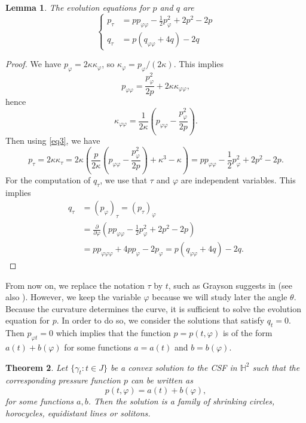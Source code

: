 \documentclass[12pt]{amsart}
\theoremstyle{plain}
\newtheorem{theorem}{Theorem}[section]
\newtheorem{lemma}[theorem]{Lemma}
\theoremstyle{definition}
\def\h{\mathbb H}
\begin{document}
\begin{lemma} 
 The evolution equations for $p$ and $q$ are 
\begin{equation}\label{evo}
\left\{
\begin{split}
p_\tau &= p p_{\varphi \varphi} - \frac{1}{2}p_{\varphi}^2 + 2p^2 - 2p \\
 q_\tau&= p(q_{\varphi \varphi} + 4q) - 2 q
\end{split}\right.
\end{equation}
\end{lemma}

\begin{proof}
We have $p_\varphi=2\kappa\kappa_\varphi$, so $\kappa_\varphi=p_\varphi/(2\kappa)$. This implies
$$p_{\varphi\varphi}=\frac{p_\varphi^2}{2p}+2\kappa\kappa_{\varphi\varphi},$$
hence
$$\kappa_{\varphi\varphi}=\frac{1}{2\kappa}\left(p_{\varphi\varphi}-\frac{p_\varphi^2}{2p}\right).$$
Then using \eqref{eq3}, we have
$$p_\tau=2\kappa\kappa_\tau=2\kappa\left(\frac{p}{2\kappa}(p_{\varphi\varphi}-\frac{p_\varphi^2}{2p})+\kappa^3-\kappa\right)=p p_{\varphi \varphi} - \frac{1}{2}p_{\varphi}^2 + 2p^2 - 2p .$$
For the computation of $q_\tau$, we use that $\tau$ and $\varphi$ are independent variables.   This implies 
\begin{equation*}
\begin{split}
q_\tau&=(p_\varphi)_\tau=(p_\tau)_\varphi\\
&=\frac{\partial}{\partial\varphi}\left(pp_{\varphi\varphi}-\frac12p_\varphi^2+2p^2-2p\right)\\
&=pp_{\varphi\varphi\varphi}+4pp_\varphi-2p_\varphi=p(q_{\varphi\varphi}+4q)-2q.
\end{split}
\end{equation*}

\end{proof}

From now on, we replace the notation $\tau$ by $t$, such as Grayson suggests in \cite{gr} (see also \cite{gh}). However, we keep the variable $\varphi$ because we will study later the angle $\theta$. Because the curvature determines the curve, it is sufficient to solve the evolution equation for $p$. In order to do so, we consider the solutions that satisfy $q_t = 0$. Then $p_{\varphi t} = 0$ which implies that the function $p=p(t,\varphi)$ is of the form $  a(t) + b(\varphi)$ for some functions $a=a(t)$ and $b=b(\varphi)$. 

\begin{theorem}\label{t42}
Let $\{\gamma_t\colon t \in J\}$ be a convex solution to the CSF in $\h^2$ such that the corresponding pressure function $p$ can be written as 
$$p(t, \varphi) = a(t) + b(\varphi),$$
for some functions $a,b$. Then the solution   is a  family of shrinking circles, horocycles, equidistant lines or solitons.
\end{theorem}
\end{document}
